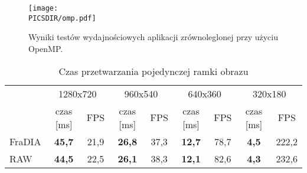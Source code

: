 \documentclass[a4paper,12pt]{article}
\def\PICSDIR{PICS}
\begin{document}
\begin{figure}
\centering
\texttt{[image: \\PICSDIR/omp.pdf]}
\caption{Wyniki testów wydajnościowych aplikacji zrównoleglonej przy użyciu OpenMP.}
\label{rys:res_omp}
\end{figure}



\begin{table}[h!]
\caption[Zadanie pierwsze -- czas przetwarzania pojedynczej ramki obrazu]{Czas przetwarzania pojedynczej ramki obrazu}
\centering
\begin{tabular}{lcccccccc}
\toprule
 & \multicolumn{2}{c}{1280x720} & \multicolumn{2}{c}{960x540} & \multicolumn{2}{c}{640x360} & \multicolumn{2}{c}{320x180} \\
\cmidrule(r){2-9}
 & czas [ms] & FPS & czas [ms] & FPS & czas [ms] & FPS & czas [ms] & FPS \\
\midrule
FraDIA & \bf 45,7 & 21,9 & \bf 26,8 & 37,3 & \bf 12,7 & 78,7 & \bf 4,5 & 222,2 \\
RAW    & \bf 44,5 & 22,5 & \bf 26,1 & 38,3 & \bf 12,1 & 82,6 & \bf 4,3 & 232,6 \\
\bottomrule
\end{tabular}
\label{tab:zad_1_wyniki}
\end{table}
\end{document}
